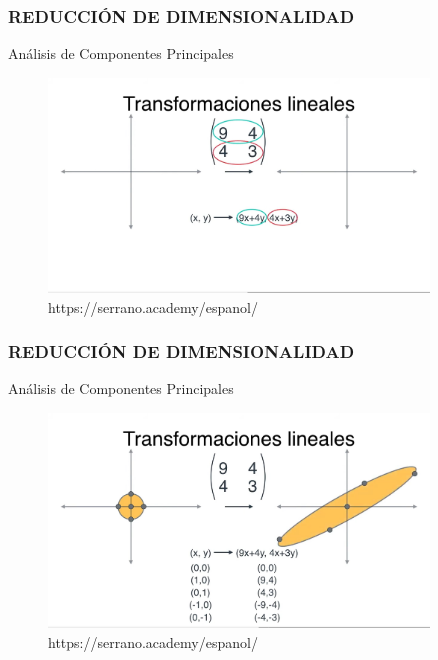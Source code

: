 \documentclass{beamer}
\begin{document}
\begin{frame}
\frametitle{REDUCCIÓN DE DIMENSIONALIDAD}
\begin{block}{Análisis de Componentes Principales}	
	\begin{figure}
		\includegraphics[width=0.9\textwidth]{PCA/IMG_3569.jpg}
		\caption{https://serrano.academy/espanol/}
	\end{figure}
\end{block}
\end{frame}

\begin{frame}
\frametitle{REDUCCIÓN DE DIMENSIONALIDAD}
\begin{block}{Análisis de Componentes Principales}	
	\begin{figure}
		\includegraphics[width=0.9\textwidth]{PCA/IMG_3570.jpg}
		\caption{https://serrano.academy/espanol/}
	\end{figure}
\end{block}
\end{frame}
\end{document}
